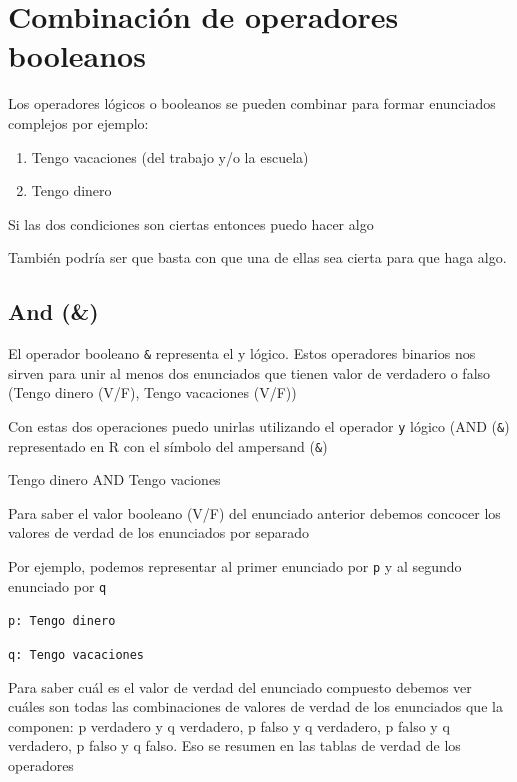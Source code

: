 \documentclass[
]{book}
\providecommand{\tightlist}{%
  \setlength{\itemsep}{0pt}\setlength{\parskip}{0pt}}
\begin{document}
\hypertarget{combinaciuxf3n-de-operadores-booleanos}{%
\section{Combinación de operadores booleanos}\label{combinaciuxf3n-de-operadores-booleanos}}

Los operadores lógicos o booleanos se pueden combinar para formar enunciados complejos por ejemplo:

\begin{enumerate}
\def\labelenumi{\arabic{enumi}.}
\tightlist
\item
  Tengo vacaciones (del trabajo y/o la escuela)
\item
  Tengo dinero
\end{enumerate}

Si las dos condiciones son ciertas entonces puedo hacer algo

También podría ser que basta con que una de ellas sea cierta para que haga algo.

\hypertarget{and}{%
\subsection{And (\&)}\label{and}}

El operador booleano \texttt{\&} representa el y lógico. Estos operadores binarios nos sirven para unir al menos dos enunciados que tienen valor de verdadero o falso (Tengo dinero (V/F), Tengo vacaciones (V/F))

Con estas dos operaciones puedo unirlas utilizando el operador \texttt{y} lógico (AND (\texttt{\&}) representado en R con el símbolo del ampersand (\texttt{\&})

Tengo dinero AND Tengo vaciones

Para saber el valor booleano (V/F) del enunciado anterior debemos concocer los valores de verdad de los enunciados por separado

Por ejemplo, podemos representar al primer enunciado por \texttt{p} y al segundo enunciado por \texttt{q}

\texttt{p:\ Tengo\ dinero}

\texttt{q:\ Tengo\ vacaciones}

Para saber cuál es el valor de verdad del enunciado compuesto debemos ver cuáles son todas las combinaciones de valores de verdad de los enunciados que la componen: p verdadero y q verdadero, p falso y q verdadero, p falso y q verdadero, p falso y q falso. Eso se resumen en las tablas de verdad de los operadores
\end{document}
